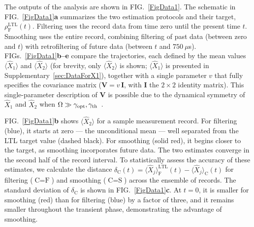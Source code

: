 \documentclass[aps,prx,twocolumn,amsmath,amssymb,superscriptaddress,floatfix,longbibliography
]{revtex4-2}
\begin{document}
The outputs of the analysis are shown in FIG.~\ref{FigData1}. The schematic in FIG.~\ref{FigData1}\textbf{a} summarizes the two estimation protocols and their target, $\rho_\text{F}^\text{LTL}(t)$. Filtering uses the record data from time zero until the present time $t$. Smoothing uses the entire record, combining filtering of past data (between zero and $t$) with retrofiltering of future data (between $t$ and $750~\mu$s). FIGs.~\ref{FigData1}\textbf{b–e} compare the trajectories, each defined by the mean values $\langle \hat{X}_1\rangle$ and $\langle \hat{X}_2\rangle$ (for brevity, only $\langle \hat{X}_2\rangle$ is shown; $\langle \hat{X}_1\rangle$ is presented in Supplementary~\ref{sec:DataForX1}), together with
a single parameter $v$ that fully specifies the covariance matrix ($\mathbf{V}=v\,\mathbf{I}$, with $\mathbf{I}$ the $2\times 2$ identity matrix). This single-parameter description of $\mathbf{V}$ is possible due to the 
dynamical symmetry of $\hat X_{1}$ and $\hat X_{2}$ when $\Omega\gg\gamma_{\rm opt},\gamma_{\rm th}$~\cite{doherty2012quantum}.

FIG.~\ref{FigData1}\textbf{b} shows $\langle\hat{X}_2\rangle$ for a sample measurement record. For filtering (blue), it starts at zero --- the unconditional mean --- well separated from the LTL target value (dashed black). For smoothing (solid red), it begins closer to the target, as smoothing incorporates future data. The two estimates converge in the second half of the record interval. To statistically assess the accuracy of these estimates, we calculate the distance $\delta_\text{C}(t)=\langle\hat{X}_j\rangle_\text{F}^\text{LTL}(t)-\langle\hat{X}_j\rangle_\text{C}(t)$ for filtering ($\text{C}=\text{F}$) and smoothing ($\text{C}=\text{S}$) across the ensemble of records. The standard deviation of $\delta_\text{C}$ is shown in FIG.~\ref{FigData1}\textbf{c}. At $t=0$, it is smaller for smoothing (red) than for filtering (blue) by a factor of three, and it remains smaller throughout the transient phase, demonstrating the advantage of smoothing.
\end{document}
